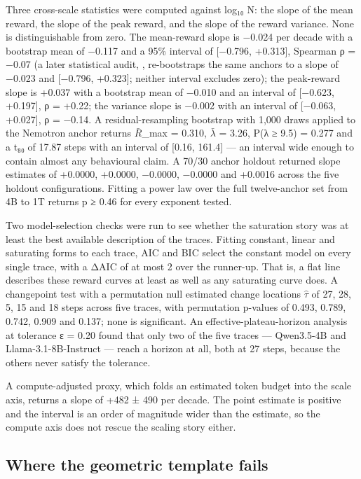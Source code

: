 \documentclass[12pt,a4paper]{report}
\DeclareRobustCommand{\longtok}[1]{\texttt{\seqsplit{#1}}}
\begin{document}
Three cross-scale statistics were computed against log₁₀ N: the slope of
the mean reward, the slope of the peak reward, and the slope of the
reward variance. None is distinguishable from zero. The mean-reward
slope is −0.024 per decade with a bootstrap mean of −0.117 and a 95\%
interval of {[}−0.796, +0.313{]}, Spearman ρ = −0.07 (a later
statistical audit,
\longtok{results/berkeley/adding\_\allowbreak{}error\_\allowbreak{}bars\_\allowbreak{}summary.json},
re-bootstraps the same anchors to a slope of −0.023 and {[}−0.796,
+0.323{]}; neither interval excludes zero); the peak-reward slope is
+0.037 with a bootstrap mean of −0.010 and an interval of {[}−0.623,
+0.197{]}, ρ = +0.22; the variance slope is −0.002 with an interval of
{[}−0.063, +0.027{]}, ρ = −0.14. A residual-resampling bootstrap with
1,000 draws applied to the Nemotron anchor returns \ensuremath{\bar{R}}\_max = 0.310, \ensuremath{\bar{λ}} =
3.26, P(λ ≥ 9.5) = 0.277 and a t₈₀ of 17.87 steps with an interval of
{[}0.16, 161.4{]} --- an interval wide enough to contain almost any
behavioural claim. A 70/30 anchor holdout returned slope estimates of
+0.0000, +0.0000, −0.0000, −0.0000 and +0.0016 across the five holdout
configurations. Fitting a power law over the full twelve-anchor set from
4B to 1T returns p ≥ 0.46 for every exponent tested.

Two model-selection checks were run to see whether the saturation story
was at least the best available description of the traces. Fitting
constant, linear and saturating forms to each trace, AIC and BIC select
the constant model on every single trace, with a ΔAIC of at most 2 over
the runner-up. That is, a flat line describes these reward curves at
least as well as any saturating curve does. A changepoint test with a
permutation null estimated change locations \ensuremath{\hat{τ}} of 27, 28, 5, 15 and 18
steps across five traces, with permutation p-values of 0.493, 0.789,
0.742, 0.909 and 0.137; none is significant. An
effective-plateau-horizon analysis at tolerance ε = 0.20 found that only
two of the five traces --- Qwen3.5-4B and Llama-3.1-8B-Instruct ---
reach a horizon at all, both at 27 steps, because the others never
satisfy the tolerance.

A compute-adjusted proxy, which folds an estimated token budget into the
scale axis, returns a slope of +482 ± 490 per decade. The point estimate
is positive and the interval is an order of magnitude wider than the
estimate, so the compute axis does not rescue the scaling story either.

\subsection{Where the geometric template
fails}\label{where-the-geometric-template-fails}
\end{document}
